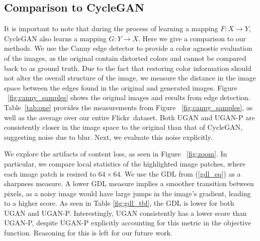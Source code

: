 

\subsection{Comparison to CycleGAN}
It is important to note that during the process of learning a mapping $F: X \rightarrow Y$, CycleGAN also learns a mapping $G: Y 
\rightarrow X$. Here we give a comparison to our methods. We use the Canny edge detector \cite{canny1986computational} to provide 
a color agnostic evaluation of the images, as the original contain distorted colors and cannot be compared back to as ground 
truth. Due to the fact that restoring color information should not alter the overall structure of the image, we measure the 
distance in the image space between the edges found in the original and generated images. Figure ~\ref{fig:canny_samples} shows 
the original images and results from edge detection. Table~\ref{tab:one} provides the measurements from Figure 
~\ref{fig:canny_samples}, as well as the average over our entire Flickr\texttrademark\ dataset. Both UGAN and UGAN-P are 
consistently closer in the image space to the original than that of CycleGAN, suggesting noise due to blur. Next, we evaluate this 
noise explicitly.

We explore the artifacts of content loss, as seen in Figure ~\ref{fig:zoom}. In particular, we compare local statistics of the 
highlighted image patches, where each image patch is resized to $64 \times 64$. We use the GDL \cite{mathieu2015deep} from 
(\ref{gdl_eq}) as a sharpness measure. A lower GDL measure implies a smoother transition between pixels, as a noisy image would 
have large jumps in the image's gradient, leading to a higher score. As seen in Table \ref{fig:gdl_tbl}, the GDL is lower for both UGAN and UGAN-P. 
Interestingly, UGAN consistently has a lower score than UGAN-P, despite UGAN-P explicitly accounting for this metric in the 
objective function. Reasoning for this is left for our future work.

